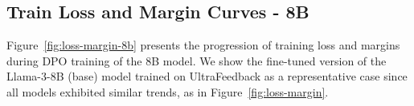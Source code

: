 \begin{figure*}[ht]
	\centering
        \vspace{-5pt}
        \vspace{-10pt}
	\caption{DPO train loss and margin on \textbf{TL;DR}, \textbf{HH}, and \textbf{UltraFeedback} datasets. The training was implemented with Llama-3.2-3B SFT version on different subsets selected by five strategies.
	}
	\label{fig:loss-margin}
	\vspace{-15pt}
\end{figure*}

\subsection{Train Loss and Margin Curves - 8B}
\label{app:loss-8b}
Figure~\ref{fig:loss-margin-8b} presents the progression of training loss and margins during DPO training of the 8B model. We show the fine-tuned version of the Llama-3-8B (base) model trained on UltraFeedback as a representative case since all models exhibited similar trends, as in Figure~\ref{fig:loss-margin}.

